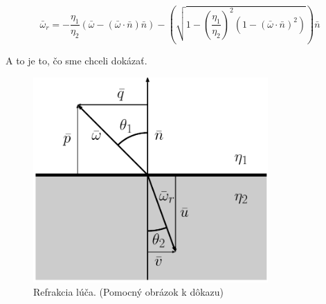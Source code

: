 \documentclass[slovak]{scrartcl}
\begin{document}
\begin{equation}\bar{\omega}_{r} = -\frac{\eta_{1}}{\eta_{2}}(\bar{\omega} - (\bar{\omega}\cdot\bar{n})\bar{n}) -\left(\sqrt{1 - \left(\frac{\eta_{1}}{\eta_{2}}\right)^{2}(1 - (\bar{\omega}\cdot\bar{n})^2 )}\right)\bar{n}\end{equation}

A to je to, čo sme chceli dokázať.

\begin{figure}[h!]
  \centering
  \includegraphics[width=0.8\textwidth]{drawing.pdf}
  \caption{Refrakcia lúča. (Pomocný obrázok k dôkazu)}
\end{figure}
\end{document}
